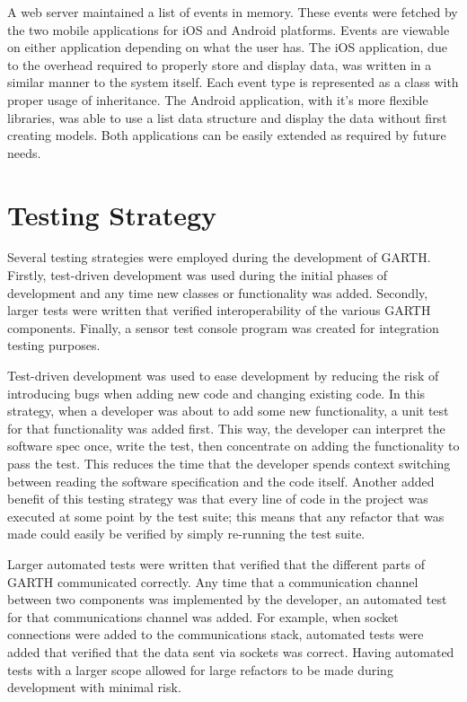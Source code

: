 \documentclass{article}
\begin{document}
A web server maintained a list of events in memory. These events were fetched
by the two mobile applications for iOS and Android platforms. Events are
viewable on either application depending on what the user has. The iOS
application, due to the overhead required to properly store and display data,
was written in a similar manner to the system itself. Each event type is
represented as a class with proper usage of inheritance. The Android
application, with it's more flexible libraries, was able to use a list data
structure and display the data without first creating models. Both applications
can be easily extended as required by future needs.

\section{Testing Strategy} %

Several testing strategies were employed during the development of
GARTH. Firstly, test-driven development was used during the initial
phases of development and any time new classes or functionality was
added. Secondly, larger tests were written that verified
interoperability of the various GARTH components. Finally, a sensor
test console program was created for integration testing purposes.

Test-driven development was used to ease development by reducing the
risk of introducing bugs when adding new code and changing existing
code. In this strategy, when a developer was about to add some new
functionality, a unit test for that functionality was added
first. This way, the developer can interpret the software spec once,
write the test, then concentrate on adding the functionality to pass
the test. This reduces the time that the developer spends context
switching between reading the software specification and the code
itself. Another added benefit of this testing strategy was that every
line of code in the project was executed at some point by the test
suite; this means that any refactor that was made could easily be
verified by simply re-running the test suite.

Larger automated tests were written that verified that the different
parts of GARTH communicated correctly. Any time that a communication
channel between two components was implemented by the developer, an
automated test for that communications channel was added. For example,
when socket connections were added to the communications stack,
automated tests were added that verified that the data sent via
sockets was correct. Having automated tests with a larger scope
allowed for large refactors to be made during development with minimal
risk.
\end{document}
